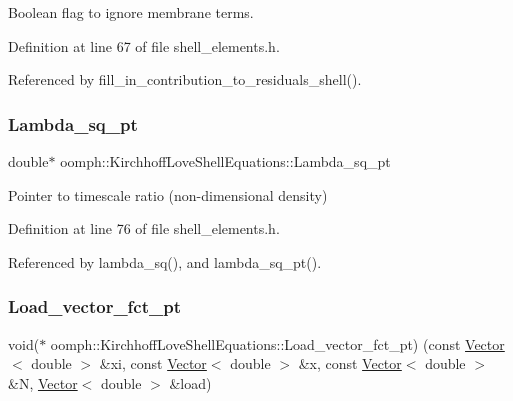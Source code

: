 Boolean flag to ignore membrane terms. 



Definition at line 67 of file shell\+\_\+elements.\+h.



Referenced by fill\+\_\+in\+\_\+contribution\+\_\+to\+\_\+residuals\+\_\+shell().

\mbox{\label{classoomph_1_1KirchhoffLoveShellEquations_a6e376a6118f141add6c76cba6551b464}} 
\subsubsection{\texorpdfstring{Lambda\+\_\+sq\+\_\+pt}{Lambda\_sq\_pt}}
{\footnotesize\ttfamily double$\ast$ oomph\+::\+Kirchhoff\+Love\+Shell\+Equations\+::\+Lambda\+\_\+sq\+\_\+pt\hspace{0.3cm}{\ttfamily [private]}}



Pointer to timescale ratio (non-\/dimensional density) 



Definition at line 76 of file shell\+\_\+elements.\+h.



Referenced by lambda\+\_\+sq(), and lambda\+\_\+sq\+\_\+pt().

\mbox{\label{classoomph_1_1KirchhoffLoveShellEquations_a9f4a216ad08e35795d0a3a6080fb9ce0}} 
\subsubsection{\texorpdfstring{Load\+\_\+vector\+\_\+fct\+\_\+pt}{Load\_vector\_fct\_pt}}
{\footnotesize\ttfamily void($\ast$ oomph\+::\+Kirchhoff\+Love\+Shell\+Equations\+::\+Load\+\_\+vector\+\_\+fct\+\_\+pt) (const \hyperlink{classoomph_1_1Vector}{Vector}$<$ double $>$ \&xi, const \hyperlink{classoomph_1_1Vector}{Vector}$<$ double $>$ \&x, const \hyperlink{classoomph_1_1Vector}{Vector}$<$ double $>$ \&N, \hyperlink{classoomph_1_1Vector}{Vector}$<$ double $>$ \&load)\hspace{0.3cm}{\ttfamily [protected]}}




